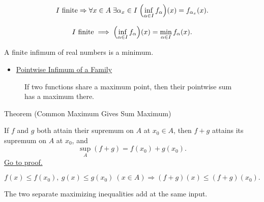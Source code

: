 \begin{remark*}
\[
  I\text{ finite}\Rightarrow
  \forall x\in A\;\exists\alpha_x\in I\;
  \Bigl(\inf_{\alpha\in I}f_\alpha\Bigr)(x)=f_{\alpha_x}(x).
\]
\end{remark*}

\begin{remark*}
\[
  I\text{ finite}
  \;\Longrightarrow\;
  \Bigl(\inf_{\alpha\in I}f_\alpha\Bigr)(x)
  =
  \min_{\alpha\in I}f_\alpha(x).
\]
\end{remark*}

\begin{remark*}[Interpretation]
A finite infimum of real numbers is a minimum.
\end{remark*}

\begin{dependencies}
\begin{itemize}
  \item \hyperref[def:pointwise-infimum-family]{Pointwise Infimum of a Family}
\end{itemize}
\end{dependencies}

\begin{figure}[htbp]
\centering

\caption{If two functions share a maximum point, then their pointwise sum has a maximum there.}
\label{fig:common-maximum-sum}
\end{figure}

\begin{theorembox}{Theorem (Common Maximum Gives Sum Maximum)}
\begin{theorem}
\label{thm:common-maximum-gives-sum-maximum}
If \(f\) and \(g\) both attain their supremum on \(A\) at \(x_0\in A\),
then \(f+g\) attains its supremum on \(A\) at \(x_0\), and
\[
  \sup_A(f+g)=f(x_0)+g(x_0).
\]
\hyperref[prf:common-maximum-gives-sum-maximum]{Go to proof.}
\end{theorem}
\end{theorembox}

\begin{remark*}
\[
  f(x)\leq f(x_0),\ g(x)\leq g(x_0)\ (x\in A)
  \Rightarrow
  (f+g)(x)\leq (f+g)(x_0).
\]
\end{remark*}

\begin{remark*}[Interpretation]
The two separate maximizing inequalities add at the same input.
\end{remark*}

